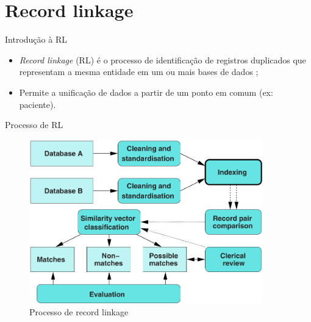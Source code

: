 \documentclass{beamer}
\begin{document}
  \section{Record linkage}

  \begin{frame}{Introdução à RL}
      \begin{itemize}
          \item \textit{Record linkage} (RL) é o processo de identificação de registros duplicados que representam a mesma entidade em um ou mais bases de dados \cite{survey};
          \item Permite a unificação de dados a partir de um ponto em comum (ex: paciente).
      \end{itemize}
  \end{frame}

  \begin{frame}{Processo de RL}
      \begin{figure}
          \centering
          \includegraphics[width=0.9\textwidth]{rlprocess.png}
          \caption{Processo de record linkage \cite{survey}}
      \end{figure}
  \end{frame}
\end{document}
